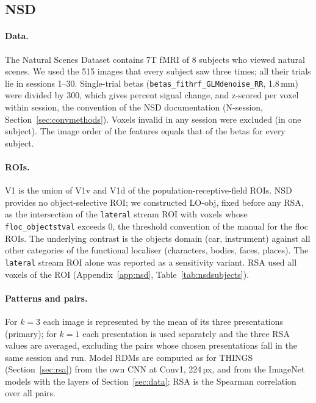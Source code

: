 \subsection{NSD}
\label{sec:nsdmethods}

\paragraph{Data.} The Natural Scenes Dataset \citep{allen2022} contains 7T fMRI of 8 subjects who
viewed natural scenes. We used the 515 images that every subject saw three times; all their trials lie
in sessions 1--30. Single-trial betas (\texttt{betas\_fithrf\_GLMdenoise\_RR}, 1.8\,mm) were divided by
300, which gives percent signal change, and z-scored per voxel within session, the convention of the
NSD documentation (N-session, Section~\ref{sec:convmethods}). Voxels invalid in any session were
excluded (in one subject). The image order of the features equals that of the betas for
every subject.

\paragraph{ROIs.} V1 is the union of V1v and V1d of the population-receptive-field ROIs. NSD provides no
object-selective ROI; we constructed LO-obj, fixed before any RSA, as the intersection of the
\texttt{lateral} stream ROI with voxels whose \texttt{floc\_objectstval} exceeds 0, the threshold
convention of the manual for the floc ROIs. The underlying contrast is the objects domain (car,
instrument) against all other categories of the functional localiser (characters, bodies, faces,
places). The \texttt{lateral} stream ROI alone was reported as a sensitivity variant. RSA used all
voxels of the ROI (Appendix~\ref{app:nsd}, Table~\ref{tab:nsdsubjects}).

\paragraph{Patterns and pairs.} For $k = 3$ each image is represented by the mean of its three
presentations (primary); for $k = 1$ each presentation is used separately and the three RSA values
are averaged, excluding the pairs whose chosen presentations fall in the same session and run.
Model RDMs are computed as for THINGS (Section~\ref{sec:rsa}) from the own CNN at Conv1, 224\,px, and
from the ImageNet models with the layers of Section~\ref{sec:data}; RSA is the Spearman correlation
over all pairs.

